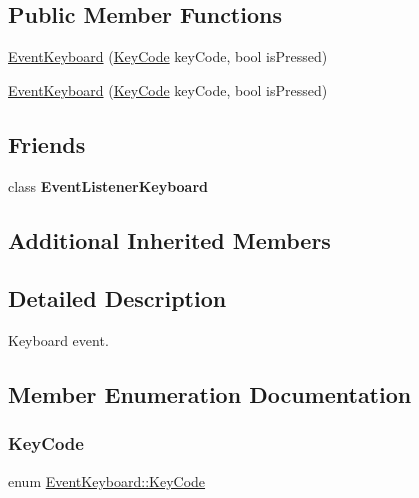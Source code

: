\subsection*{Public Member Functions}
\begin{DoxyCompactItemize}
\item 
\hyperlink{classEventKeyboard_ab838fada633a54281037a657a88c0675}{Event\+Keyboard} (\hyperlink{classEventKeyboard_a7cd3fa46515673276ce8ec7f0e051606}{Key\+Code} key\+Code, bool is\+Pressed)
\item 
\hyperlink{classEventKeyboard_a15f510c42ff39a6d255bf5732897f90d}{Event\+Keyboard} (\hyperlink{classEventKeyboard_a7cd3fa46515673276ce8ec7f0e051606}{Key\+Code} key\+Code, bool is\+Pressed)
\end{DoxyCompactItemize}
\subsection*{Friends}
\begin{DoxyCompactItemize}
\item 
\mbox{\label{classEventKeyboard_a04f35756735850113319f1dd3b6ebe2c}} 
class {\bfseries Event\+Listener\+Keyboard}
\end{DoxyCompactItemize}
\subsection*{Additional Inherited Members}


\subsection{Detailed Description}
Keyboard event. 

\subsection{Member Enumeration Documentation}
\mbox{\label{classEventKeyboard_a7cd3fa46515673276ce8ec7f0e051606}} 
\subsubsection{\texorpdfstring{Key\+Code}{KeyCode}\hspace{0.1cm}{\footnotesize\ttfamily [1/2]}}
{\footnotesize\ttfamily enum \hyperlink{classEventKeyboard_a7cd3fa46515673276ce8ec7f0e051606}{Event\+Keyboard\+::\+Key\+Code}\hspace{0.3cm}{\ttfamily [strong]}}

